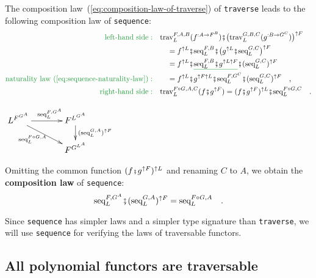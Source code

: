 The composition law~(\ref{eq:composition-law-of-traverse}) of \lstinline!traverse!
leads to the following composition law of \lstinline!sequence!:
\begin{align*}
{\color{greenunder}\text{left-hand side}:}\quad & \text{trav}_{L}^{F,A,B}(f^{:A\rightarrow F^{B}})\bef\big(\text{trav}_{L}^{G,B,C}(g^{:B\rightarrow G^{C}})\big)^{\uparrow F}\\
 & \quad=f^{\uparrow L}\bef\text{seq}_{L}^{F,B}\bef\big(g^{\uparrow L}\bef\text{seq}_{L}^{G,C}\big)^{\uparrow F}\\
 & \quad=f^{\uparrow L}\bef\gunderline{\text{seq}_{L}^{F,B}\bef g^{\uparrow L\uparrow F}}\bef(\text{seq}_{L}^{G,C})^{\uparrow F}\\
{\color{greenunder}\text{naturality law~(\ref{eq:sequence-naturality-law})}:}\quad & \quad=f^{\uparrow L}\bef g^{\uparrow F\uparrow L}\bef\text{seq}_{L}^{F,G^{C}}\bef(\text{seq}_{L}^{G,C})^{\uparrow F}\quad,\\
{\color{greenunder}\text{right-hand side}:}\quad & \text{trav}_{L}^{F\circ G,A,C}(f\bef g^{\uparrow F})=(f\bef g^{\uparrow F})^{\uparrow L}\bef\text{seq}_{L}^{F\circ G,C}\quad.
\end{align*}

\begin{center}
$\xymatrix{\xyScaleY{1.4pc}\xyScaleX{3.0pc}L^{F^{G^{A}}}\ar[r]\sp(0.55){\text{seq}_{L}^{F,G^{A}}}\ar[rd]\sb(0.4){\text{seq}_{L}^{F\circ G,A}} & F^{L^{G^{A}}}\ar[d]\sp(0.4){(\text{seq}_{L}^{G,A})^{\uparrow F}}\\
 & F^{G^{L^{A}}}
}
$
\par\end{center}

Omitting the common function $(f\bef g^{\uparrow F})^{\uparrow L}$
and renaming $C$ to $A$, we obtain the \textbf{composition
law} of \lstinline!sequence!:
\begin{equation}
\text{seq}_{L}^{F,G^{A}}\bef(\text{seq}_{L}^{G,A})^{\uparrow F}=\text{seq}_{L}^{F\circ G,A}\quad.\label{eq:composition-law-of-sequence}
\end{equation}

Since \lstinline!sequence! has simpler laws and a simpler type signature
than \lstinline!traverse!, we will use \lstinline!sequence! for
verifying the laws of traversable functors. 

\subsection{All polynomial functors are traversable\label{subsec:All-polynomial-functors-are-traversable}}

